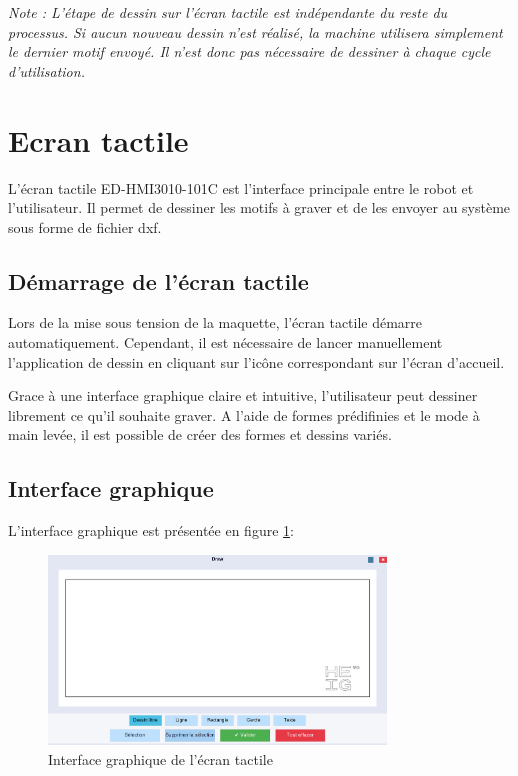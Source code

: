 \textit{Note : L'étape de dessin sur l'écran tactile est indépendante du reste du processus. Si aucun nouveau dessin n'est réalisé, la machine utilisera simplement le dernier motif envoyé. Il n'est donc pas nécessaire de dessiner à chaque cycle d'utilisation.}

\section{Ecran tactile}

L'écran tactile \gls{ED-HMI3010-101C} est l'interface principale entre le robot et l'utilisateur. Il permet de dessiner les motifs à graver et de les envoyer au système sous forme de fichier \gls{dxf}.

\subsection{Démarrage de l'écran tactile}

Lors de la mise sous tension de la maquette, l'écran tactile démarre automatiquement. Cependant, il est nécessaire de lancer manuellement l'application de dessin en cliquant sur l'icône correspondant sur l'écran d'accueil.

Grace à une interface graphique claire et intuitive, l'utilisateur peut dessiner librement ce qu'il souhaite graver. A l'aide de formes prédifinies et le mode à main levée, il est possible de créer des formes et dessins variés.

\subsection{Interface graphique}

L'interface graphique est présentée en figure \ref{fig:interface_graphique}:
\begin{figure}[H]
    \centering
    \includegraphics[width=0.8\textwidth]{assets/figures/Draw_app.png}
    \caption{Interface graphique de l'écran tactile}
    \label{fig:interface_graphique}
\end{figure}

